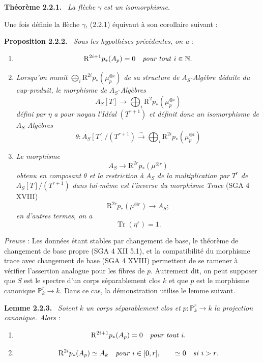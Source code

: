 \documentclass[11pt]{article}
\newenvironment{statement}[1]{\par\medskip\noindent\textbf{#1.}\ }{\par\medskip}
\begin{document}
\begin{statement}{Théorème 2.2.1}
\emph{La flèche} $\gamma$ \emph{est un isomorphisme}.
\end{statement}

Une fois définie la flèche $\gamma$, (2.2.1) équivaut à son corollaire suivant :

\begin{statement}{Proposition 2.2.2}
\emph{Sous les hypothèses précédentes, on a} :
\begin{enumerate}[label=\alph*)]
\item
\[
\mathrm{R}^{2i+1}p_*(A_p)=0\quad\text{\emph{pour tout} }i\in\mathbb N.
\]
\item \emph{Lorsqu'on munit} $\bigoplus_i \mathrm{R}^{2i}p_*(\mu_p^{\otimes i})$ \emph{de sa structure de} $A_S$-\emph{Algèbre déduite du cup-produit, le morphisme de} $A_S$-\emph{Algèbres}
\[
A_S[T]\longrightarrow \bigoplus_i \mathrm{R}^{2}p_*(\mu_p^{\otimes i})
\]
\emph{défini par} $\eta$ \emph{a pour noyau l'Idéal} $(T^{r+1})$ \emph{et définit donc un isomorphisme de} $A_S$-\emph{Algèbres}
\[
\theta:A_S[T]/(T^{r+1})\xrightarrow{\sim}\bigoplus_i \mathrm{R}^{2i}p_*(\mu_p^{\otimes i})
\]
\item \emph{Le morphisme}
\[
A_S\longrightarrow \mathrm{R}^{2r}p_*(\mu^{\otimes r})
\]
\emph{obtenu en composant} $\theta$ \emph{et la restriction à} $A_S$ \emph{de la multiplication par} $T^r$ \emph{de} $A_S[T]/(T^{r+1})$ \emph{dans lui-même est l'inverse du morphisme Trace} (SGA 4 XVIII)
\[
\mathrm{R}^{2r}p_*(\mu^{\otimes r})\longrightarrow A_S;
\]
\emph{en d'autres termes, on a}
\[
\operatorname{Tr}(\eta^r)=1.
\]
\end{enumerate}
\end{statement}

\emph{Preuve} : Les données étant stables par changement de base, le théorème de changement de base propre (SGA 4 XII 5.1), et la compatibilité du morphisme trace avec changement de base (SGA 4 XVIII) permettent de se ramener à vérifier l'assertion analogue pour les fibres de $p$. Autrement dit, on peut supposer que $S$ est le spectre d'un corps séparablement clos $k$ et que $p$ est le morphisme canonique $\mathbb P^r_k\to k$. Dans ce cas, la démonstration utilise le lemme suivant.

\begin{statement}{Lemme 2.2.3}
\emph{Soient} $k$ \emph{un corps séparablement clos et} $p:\mathbb P_k^r\to k$ \emph{la projection canonique. Alors} :
\begin{enumerate}[label=\alph*)]
\item
\[
\mathrm{R}^{2i+1}p_*(A_p)=0\quad\text{\emph{pour tout} }i.
\]
\item
\[
\mathrm{R}^{2i}p_*(A_p)\simeq A_k\quad\text{\emph{pour} }i\in[0,r],
\qquad
\simeq 0\quad\text{\emph{si} }i>r.
\]
\end{enumerate}
\end{statement}
\end{document}
